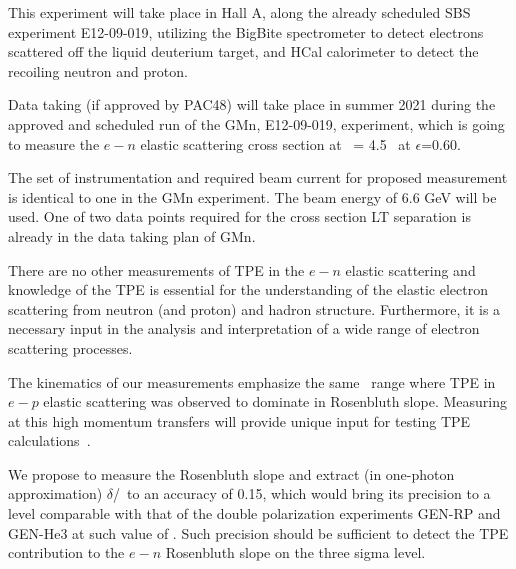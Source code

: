 This experiment will take place in Hall A, along the already scheduled SBS \gmn experiment E12-09-019, utilizing the BigBite spectrometer to detect electrons scattered off 
the liquid deuterium target, and HCal calorimeter to detect the recoiling neutron and proton.

Data taking (if approved by PAC48) will take place in summer 2021 during the approved and scheduled run of the GMn, E12-09-019, experiment,
which is going to measure the $e-n$ elastic scattering cross section at \qsq~= 4.5 \gevcsq~at $\epsilon$=0.60.

The set of instrumentation and required beam current for proposed measurement is identical to one in the GMn experiment.
The beam energy of 6.6 GeV will be used.
One of two data points required for the cross section LT separation is already in the data taking plan of GMn.

There are no other measurements of TPE in the $e-n$ elastic scattering and knowledge of the TPE is essential for the understanding 
of the elastic electron scattering from neutron (and proton) and hadron structure.  
Furthermore, it is a necessary input in the analysis and interpretation of a wide range of electron scattering processes. 

The kinematics of our measurements emphasize the same \qsq~range where TPE in $e-p$ elastic scattering was observed to dominate in Rosenbluth slope.
Measuring at this high momentum transfers will provide unique input for testing TPE calculations~\cite{Blunden:2005ew}.

We propose to measure the Rosenbluth slope and extract (in one-photon approximation) $\delta$\gen/\gmn~to an accuracy of 0.15, which would bring its precision to a level comparable with that of the double polarization experiments GEN-RP and GEN-He3 at such value of \qsq.
Such precision should be sufficient to detect the TPE contribution to the $e-n$ Rosenbluth slope on the three sigma level.


